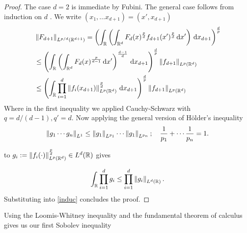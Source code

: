 \documentclass[
    a4paper,
    DIV=14,
    abstract=true,
    numbers=noenddot
]{scrartcl}
\begin{document}
\begin{proof}
	The case $d=2$ is immediate by Fubini. The general case follows from induction on  $d$ . We write $(x_1,\ldots x_{d+1})=(x',x_{d+1})$
	\begin{align}\label{induc}
		 & \left\lVert F_{d+1} \right\rVert_{L^{p /d}(\mathbb{R}^{d+1})}  =\left(\int_{\mathbb{R}}\left(\int_{\mathbb{R}^d} F_d(x)^{\frac{p}{d}} f_{d+1}(x')^{\frac{p}{d}} \,\mathrm{d} x'  \right)  \,\mathrm{d} x_{d+1} \right)^{\frac{d}{p} }          \\
		 & \leq \left(\int_{\mathbb{R}}         \left(\int_{\mathbb{R}^d} F_d(x)^{\frac{p}{d-1}} \,\mathrm{d} x'  \right)^{\frac{d-1}{d}}\,\mathrm{d} x_{d+1} \right)^{\frac{d}{p} }\left\lVert f_{d+1} \right\rVert_{L^p(\mathbb{R}^d)}      \notag      \\
		 & \leq \left(\int_{\mathbb{R}} \prod_{i=1}^d\left\|f_i(x_{d+1})\right\|_{L^p\left(\mathbb{R}^{d}\right)}^{\frac{p}{d}} \,\mathrm{d} x_{d+1}\right)^{\frac{d}{p}}\left\lVert f_{d+1} \right\rVert_{L^p(\mathbb{R}^{d})}\end{align}
	Where in the first inequality we applied Cauchy-Schwarz with $q= d /(d-1), q' =d$. Now applying the general version of Hölder's inequality\begin{align*}
		\left\lVert g_1\cdots g_n  \right\rVert_{L^1} \leq \left\lVert g_1 \right\rVert_{L^{p_1}}\cdots\left\lVert g_1 \right\rVert_{L^{p_n}}; \quad  \frac{1}{p_1}+\cdots \frac{1}{p_n}=1\notag          .
	\end{align*}


	to $g_i:= \left\lVert f_i(\cdot ) \right\rVert^{\frac{p}{d}}_{L^p(\mathbb{R}^{d})} \in L^{d}(\mathbb{R})$ gives

	\begin{align*}
		\int_{\mathbb{R}}\prod_{i=1}^{d}g_i \leq \prod_{i=1}^{d} \left\lVert g_i \right\rVert_{L^d(\mathbb{R})}    .
	\end{align*}
	Substituting into \eqref{induc} concludes the proof.
\end{proof}
Using the Loomis-Whitney inequality and the fundamental theorem of calculus gives us our first Sobolev inequality
\end{document}
